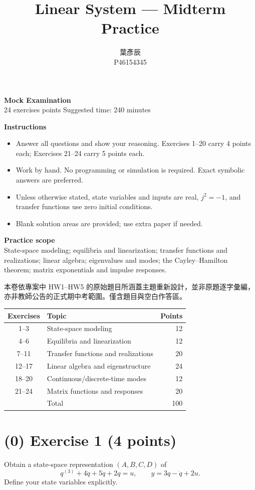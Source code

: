 \documentclass[12pt,a4paper]{article}
\title{Linear System --- Midterm Practice}
\author{葉彥辰\\P46154345}
\date{}
\begin{document}
\maketitle
\begin{center}
\textbf{Mock Examination}\\[6pt]
24 exercises  points \quad Suggested time: 240 minutes
\end{center}
\bigskip
\textbf{Instructions}
\begin{itemize}
\item Answer all questions and show your reasoning. Exercises 1--20 carry 4 points each; Exercises 21--24 carry 5 points each.
\item Work by hand. No programming or simulation is required. Exact symbolic answers are preferred.
\item Unless otherwise stated, state variables and inputs are real, $j^2=-1$, and transfer functions use zero initial conditions.
\item Blank solution areas are provided; use extra paper if needed.
\end{itemize}
\bigskip
\textbf{Practice scope}\\
State-space modeling; equilibria and linearization; transfer functions and realizations; linear algebra; eigenvalues and modes; the Cayley--Hamilton theorem; matrix exponentials and impulse responses.
\bigskip

本卷依專案中 HW1--HW5 的原始題目所涵蓋主題重新設計，並非原題逐字彙編，亦非教師公告的正式期中考範圍。僅含題目與空白作答區。
\bigskip

\begin{center}
\begin{tabular}{c|l|r}
Exercises & Topic & Points\\ \hline
1--3 & State-space modeling & 12\\
4--6 & Equilibria and linearization & 12\\
7--11 & Transfer functions and realizations & 20\\
12--17 & Linear algebra and eigenstructure & 24\\
18--20 & Continuous/discrete-time modes & 12\\
21--24 & Matrix functions and responses & 20\\ \hline
 & Total & 100
\end{tabular}
\end{center}
\clearpage
\section*{(0) Exercise 1 \hfill {\normalsize (4 points)}}
Obtain a state-space representation $(A,B,C,D)$ of
\[
q^{(3)}+4\ddot q+5\dot q+2q=u,\qquad y=3q-\dot q+2u.
\]
Define your state variables explicitly.
\end{document}
